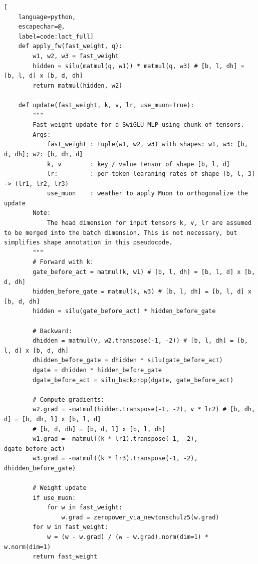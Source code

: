 \documentclass{article}
\begin{document}
\begin{algorithm}[p]
\caption{Large Chunk Test-Time Training Layer Pseudocode}\label{alg:full_lact_layer}
\newcommand{\hlbox}[1]{
  \fboxsep=1.2pt\hspace*{-\fboxsep}\colorbox{blue!10}{\detokenize{#1}}
}
\lstset{style=mocov3}
\begin{lstlisting}[
    language=python,
    escapechar=@,
    label=code:lact_full]
    def apply_fw(fast_weight, q):
        w1, w2, w3 = fast_weight
        hidden = silu(matmul(q, w1)) * matmul(q, w3) # [b, l, dh] = [b, l, d] x [b, d, dh]
        return matmul(hidden, w2)

    def update(fast_weight, k, v, lr, use_muon=True):
        """
        Fast-weight update for a SwiGLU MLP using chunk of tensors. 
        Args:
            fast_weight : tuple(w1, w2, w3) with shapes: w1, w3: [b, d, dh]; w2: [b, dh, d]
            k, v        : key / value tensor of shape [b, l, d]
            lr:         : per-token learaning rates of shape [b, l, 3] -> (lr1, lr2, lr3)
            use_muon    : weather to apply Muon to orthogonalize the update
        Note:
            The head dimension for input tensors k, v, lr are assumed to be merged into the batch dimension. This is not necessary, but simplifies shape annotation in this pseudocode.
        """
        # Forward with k:
        gate_before_act = matmul(k, w1) # [b, l, dh] = [b, l, d] x [b, d, dh]
        hidden_before_gate = matmul(k, w3) # [b, l, dh] = [b, l, d] x [b, d, dh]
        hidden = silu(gate_before_act) * hidden_before_gate

        # Backward:
        dhidden = matmul(v, w2.transpose(-1, -2)) # [b, l, dh] = [b, l, d] x [b, d, dh]
        dhidden_before_gate = dhidden * silu(gate_before_act)
        dgate = dhidden * hidden_before_gate
        dgate_before_act = silu_backprop(dgate, gate_before_act)

        # Compute gradients: 
        w2.grad = -matmul(hidden.transpose(-1, -2), v * lr2) # [b, dh, d] = [b, dh, l] x [b, l, d]
        # [b, d, dh] = [b, d, l] x [b, l, dh]
        w1.grad = -matmul((k * lr1).transpose(-1, -2), dgate_before_act)
        w3.grad = -matmul((k * lr3).transpose(-1, -2), dhidden_before_gate)

        # Weight update
        if use_muon:
            for w in fast_weight:
                w.grad = zeropower_via_newtonschulz5(w.grad)
        for w in fast_weight:
            w = (w - w.grad) / (w - w.grad).norm(dim=1) * w.norm(dim=1)
        return fast_weight


\end{lstlisting}
\end{algorithm}
\end{document}
